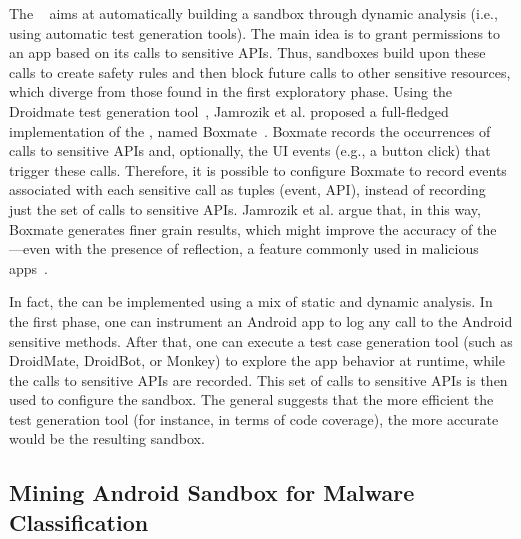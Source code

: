 
The \mas~\cite{DBLP:conf/icse/JamrozikSZ16} aims at automatically
building a sandbox through dynamic analysis (i.e., using automatic test generation tools).
The main idea is to grant permissions to an app based on its calls to sensitive APIs.
Thus, sandboxes build upon these calls to create safety rules and then block future
calls to other sensitive resources, which diverge from those found in the first exploratory
phase. Using the Droidmate test generation tool~\cite{DBLP:conf/icse/JamrozikZ16},
Jamrozik et al. proposed a full-fledged
implementation of the \mas, named Boxmate~\cite{DBLP:conf/icse/JamrozikSZ16}. 
Boxmate records the occurrences of calls to sensitive APIs and, optionally, the UI
events (e.g., a button click) that trigger these calls. Therefore, it is possible to configure Boxmate to record events associated with each sensitive call as
tuples (event, API), instead of recording just the set of calls to sensitive APIs. Jamrozik et al. argue that, in this way, Boxmate generates finer
grain results, which
might improve the accuracy of the \mas---even with the presence of reflection, a feature commonly used in
malicious apps~\cite{DBLP:conf/issta/0029BOK16}.

In fact, the \mas can be implemented using
a mix of static and dynamic analysis. In the first phase, one
can instrument an Android app to log any call to the Android sensitive methods.
After that, one can execute a test case generation tool (such as DroidMate, DroidBot, or Monkey) to explore the app behavior at runtime,
while the calls to sensitive APIs are recorded.
This set of calls to sensitive APIs is then used
to configure the sandbox. The general \mas %
suggests that the more efficient the test generation tool (for instance, in terms of code coverage),
the more accurate would be the resulting sandbox.



\subsection{Mining Android Sandbox for Malware Classification}

